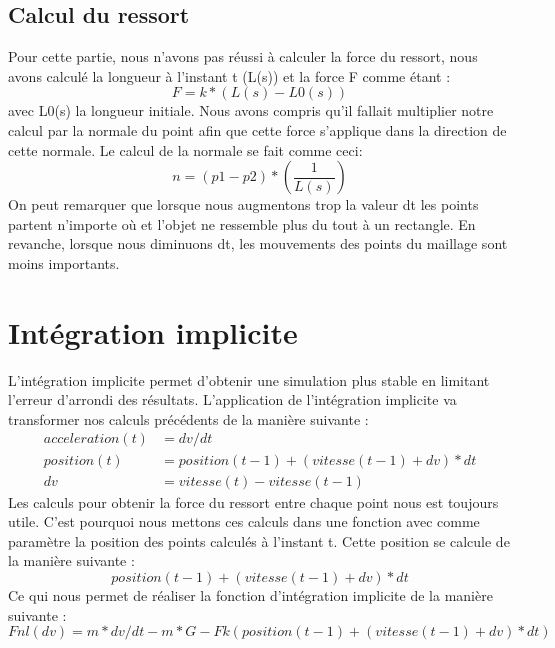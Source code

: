 \documentclass[a4paper,11pt]{article}
\begin{document}
\subsection{Calcul du ressort}
Pour cette partie, nous n'avons pas réussi à calculer la force du ressort, nous avons calculé la longueur 
à l'instant t (L(s)) et la force F comme étant :
\begin{equation}
F = k*(L(s)-L0(s))
\end{equation}
avec L0(s) la longueur initiale.
Nous avons compris qu'il fallait multiplier notre calcul par la normale du point afin que cette force
s'applique dans la direction de cette normale. Le calcul de la normale se fait comme ceci:
\begin{equation}
n = (p1 - p2) * (\frac{1}{L(s)})
\end{equation}
On peut remarquer que lorsque nous augmentons trop la valeur dt les points partent n'importe où
et l'objet ne ressemble plus du tout à un rectangle. En revanche, lorsque nous diminuons dt,
les mouvements des points du maillage sont moins importants.

\section{Intégration implicite}
L'intégration implicite permet d'obtenir une simulation plus stable en limitant l'erreur d'arrondi
des résultats. L'application de l'intégration implicite va transformer nos calculs précédents de 
la manière suivante :
\begin{align}
  acceleration(t) &= dv / dt\\
  position(t) &= position(t-1) + (vitesse(t-1) + dv) * dt\\
  dv &= vitesse(t) - vitesse(t-1) 
\end{align}
Les calculs pour obtenir la force du ressort entre chaque point nous est toujours utile. C'est pourquoi
nous mettons ces calculs dans une fonction avec comme paramètre la position des points calculés à l'instant t.
Cette position se calcule de la manière suivante :
\begin{equation}
  position(t-1) + (vitesse(t-1) + dv)*dt
\end{equation}
Ce qui nous permet de réaliser la fonction d'intégration implicite de la manière suivante :
\begin{equation}
  Fnl(dv) = m * dv/dt - m*G - Fk(position(t-1) + (vitesse(t-1) + dv)*dt)
\end{equation}
\end{document}
